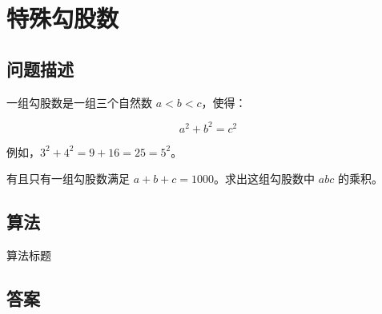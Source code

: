 \section{特殊勾股数}
\subsection{问题描述}
\begin{tcolorbox}
一组勾股数是一组三个自然数 \( a < b < c \)，使得：

\[
a^2 + b^2 = c^2
\]

例如，\( 3^2 + 4^2 = 9 + 16 = 25 = 5^2 \)。

有且只有一组勾股数满足 \( a + b + c = 1000 \)。求出这组勾股数中 \( abc \) 的乘积。
\end{tcolorbox}

\subsection{算法}
\begin{algorithm}
	\caption{算法标题}
	\begin{algorithmic}[1]

	\end{algorithmic}
\end{algorithm}

\subsection{答案}
